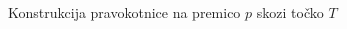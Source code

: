 \begin{frame}{Konstrukcija pravokotnice na premico $p$ skozi točko $T$}
\begin{columns}
\begin{column}{0.55\textwidth}
		\end{column}
	\end{columns}	
		
	\end{frame}	



